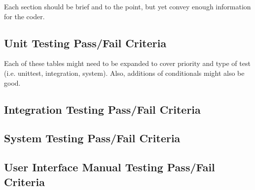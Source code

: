 \documentclass[report]{article}
\newcounter{rc}
\begin{document}
Each section should be brief and to the point, but yet convey enough information for the coder.

\subsection{Unit Testing Pass/Fail Criteria}
Each of these tables might need to be expanded to cover priority and type of test (i.e. unittest, integration, system). Also, additions of conditionals might also be good.

\newcommand{\first}{.5cm}
\newcommand{\second}{4.5cm}
\newcommand{\third}{4.5cm}
\newcommand{\fourth}{4.5cm}


\newpage


\subsection{Integration Testing Pass/Fail Criteria}


\newpage

\newpage

\newpage

\newpage

\newpage

\newpage

\newpage

\newpage

\newpage

\newpage

\newpage

\newpage


\newpage


\subsection{System Testing Pass/Fail Criteria}

%

\subsection{User Interface Manual Testing Pass/Fail Criteria}

%
\end{document}
